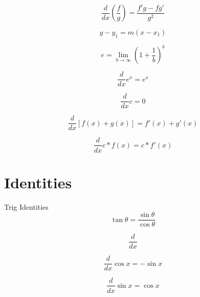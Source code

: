 \documentclass[12pt, english]{article}
\begin{document}
\noindent
{}
\begin{equation}
	\frac{d}{dx} \left(\frac{f}{g}\right) = \frac{f'g - fg'}{g^2}
\end{equation}

\noindent
{}
\begin{equation}
	y-y_1 = m(x-x_1) 
\end{equation}

\noindent
{}
\begin{equation}
	e = \lim_{b \to \infty} (1+\frac{1}{b})^b 
\end{equation}

\noindent
{}
\begin{equation}
	\frac{d}{dx} e^x = e^x 
\end{equation}

\noindent
{}
\begin{equation}
	\frac{d}{dx} c = 0 
\end{equation}

\noindent
{}
\begin{equation}
	\frac{d}{dx} [f(x)+g(x)] = f'(x)+g'(x) 
\end{equation}

\noindent
{}
\begin{equation}
	\frac{d}{dx} c * f(x) = c * f'(x) 
\end{equation}

\section{Identities}
Trig Identities
\begin{equation}
	\tan \theta = \frac{\sin \theta}{\cos \theta}
\end{equation}

\noindent
{}
\begin{equation}
	\frac{d}{dx} 
\end{equation}

\noindent
{}
\begin{equation}
	\frac{d}{dx} \cos x = -\sin x
\end{equation}

\noindent
{}
\begin{equation}
	\frac{d}{dx} \sin x = \cos x
\end{equation}
\end{document}
